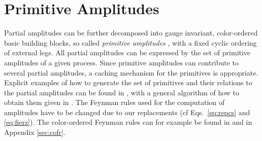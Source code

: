 \section{Primitive Amplitudes}
\label{sec:primitives}
Partial amplitudes can be further decomposed into gauge invariant,
color-ordered basic building blocks, so called \textit{primitive amplitudes}
\cite{Bern1995b}, with a fixed cyclic ordering of external
legs. All partial amplitudes can be expressed by the set of primitive amplitudes
of a given process. Since primitive amplitudes can contribute to
several partial amplitudes, a caching mechanism for the primitives is
appropriate. Explicit examples of how to generate the set of primitives
and their relations to the partial amplitudes can be found in \cite{Bern1995b,Bern:1997sc}, with a general algorithm of how to
obtain them given in \cite{Ita:2011ar}. The Feynman rules used for the
computation of amplitudes have to be changed due to
our replacements (cf Eqs.~\eqref{eq:repcs} and \eqref{eq:fierz}). The
color-ordered Feynman rules can for example be found in
\cite{Mangano1991} and in Appendix \ref{sec:cofr}.

